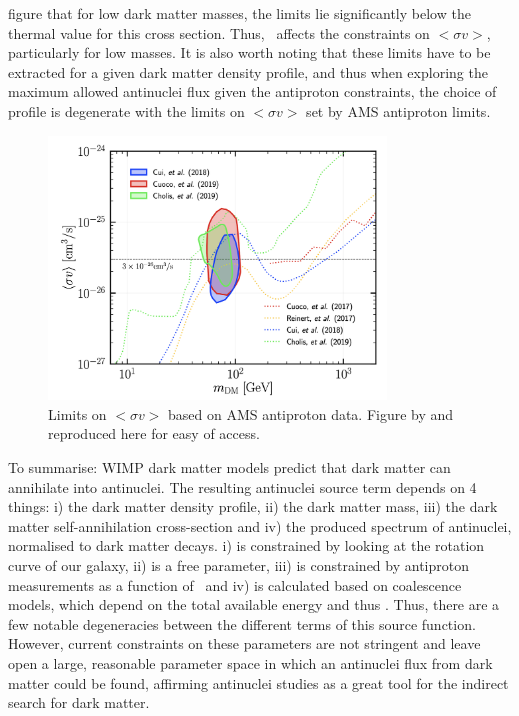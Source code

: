 figure that for low dark matter masses, the limits lie significantly below the thermal value for this cross section. Thus, \dmm\ affects the constraints on  $<\sigma v>$, particularly for low masses. It is also worth noting that these limits have to be extracted for a given dark matter density profile, and thus when exploring the maximum allowed antinuclei flux given the antiproton constraints, the choice of profile is degenerate with the limits on $<\sigma v>$ set by AMS antiproton limits.\\

\begin{figure}[h]
    \centering
    \includegraphics[width=0.8\textwidth]{figures/PbarLimitsAMS.png}
    \caption{Limits on  $<\sigma v>$ based on AMS antiproton data. Figure by \cite{} and reproduced here for easy of access.}
    \label{fig:DMSigmaVLimits}
\end{figure}

To summarise: WIMP dark matter models predict that dark matter can annihilate into antinuclei. The resulting antinuclei source term depends on 4 things: i) the dark matter density profile, ii) the dark matter mass, iii) the dark matter self-annihilation cross-section and iv) the produced spectrum of antinuclei, normalised to dark matter decays. i) is constrained by looking at the rotation curve of our galaxy, ii) is a free parameter, iii) is constrained by antiproton measurements as a function of \dmm\ and iv) is calculated based on coalescence models, which depend on the total available energy and thus \dmm. Thus, there are a few notable degeneracies between the different terms of this source function. However, current constraints on these parameters are not stringent and leave open a large, reasonable parameter space in which an antinuclei flux from dark matter could be found, affirming antinuclei studies as a great tool for the indirect search for dark matter.



